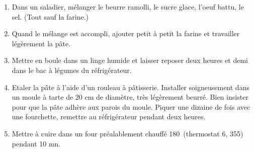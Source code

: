 
\begin{ingredients}
\end{ingredients}

\begin{recipe}
  \begin{enumerate}

  \item Dans un saladier, m\'elanger le beurre ramolli, le sucre glace, l'oeuf
    battu, le sel.  (Tout sauf la farine.)

  \item 
    Quand le m\'elange est accompli, ajouter petit \`a petit la farine et
    travailler l\'eg\`erement la p\^ate.

  \item 
    Mettre en boule dans un linge humide et laisser reposer deux heures et
    demi dans le bac \`a l\'egumes du r\'efrig\'erateur.

  \item 
    Etaler la p\^ate \`a l'aide d'un rouleau \`a p\^atisserie.
    Installer soigneusement dans un moule \`a tarte de 20 cm de diam\`etre,
    tr\`es l\'eg\`erement beurr\'e.
    Bien insister pour que la p\^ate adh\`ere aux parois du moule. Piquer une
    dizaine de fois avec une fourchette, remettre au r\'efrig\'erateur pendant
    deux heures.

  \item Mettre \`a cuire dans un four pr\'ealablement chauff\'e 180\degreeC\
    (thermostat 6, 355\F) pendant 10 mn.

  \end{enumerate}
\end{recipe}


\begin{ingredients}
\end{ingredients}


